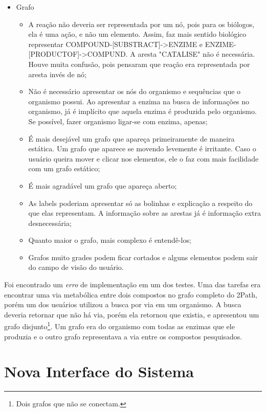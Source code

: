 \begin{itemize}
\item Grafo
  \begin{itemize}
  \item[1] A reação não deveria ser representada por um nó, pois para os biólogos, ela é uma ação, e não um elemento. Assim, faz mais sentido biológico representar COMPOUND-[SUBSTRACT]->ENZIME e ENZIME-[PRODUCTOF]->COMPUND. A aresta "CATALISE" não é necessária. Houve muita confusão, pois pensaram que reação era representada por aresta invés de nó;
  \item[2] Não é necessário apresentar os nós do organismo e sequências que o organismo possui. Ao apresentar a enzima na busca de informações no organismo, já é implícito que aquela enzima é produzida pelo organismo. Se possível, fazer organismo ligar-se com enzima, apenas;
  \item[3] É mais desejável um grafo que apareça primeiramente de maneira estática. Um grafo que aparece se movendo levemente é irritante. Caso o usuário queira mover e clicar nos elementos, ele o faz com mais facilidade com um grafo estático;
  \item[4] É mais agradável um grafo que apareça aberto;
  \item[5] As labels poderiam apresentar só as bolinhas e explicação a respeito do que elas representam. A informação sobre as arestas já é informação extra desnecessária;
  \item[6] Quanto maior o grafo, mais complexo é entendê-los;
  \item[7] Grafos muito grades podem ficar cortados e alguns elementos podem sair do campo de visão do usuário.
  \end{itemize}
\end{itemize}


Foi encontrado um \textit{erro} de implementação em um dos testes. Uma das tarefas era encontrar uma via metabólica entre dois compostos no grafo completo do 2Path, porém um dos usuários utilizou a busca por via em um organismo. A busca deveria retornar que não há via, porém ela retornou que existia, e apresentou um grafo disjunto\footnote{Dois grafos que não se conectam.}. Um grafo era do organismo com todas as enzimas que ele produzia e o outro grafo representava a via entre os compostos pesquisados.


 
 
 

\section{Nova Interface do Sistema}

